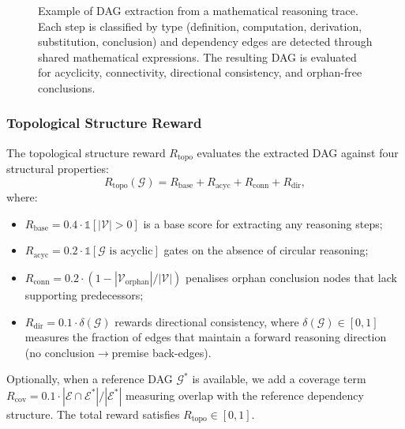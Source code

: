 \begin{figure}[t]
    \centering
    \caption{Example of DAG extraction from a mathematical reasoning
    trace. Each step is classified by type (definition, computation,
    derivation, substitution, conclusion) and dependency edges are
    detected through shared mathematical expressions. The resulting DAG
    is evaluated for acyclicity, connectivity, directional consistency,
    and orphan-free conclusions.}
    \label{fig:dag_extraction}
\end{figure}

\subsubsection{Topological Structure Reward}
\label{sec:r_topo}

The topological structure reward $R_{\mathrm{topo}}$ evaluates the
extracted DAG against four structural properties:
\begin{equation}
\label{eq:r_topo}
R_{\mathrm{topo}}(\mathcal{G}) = R_{\mathrm{base}} + R_{\mathrm{acyc}}
    + R_{\mathrm{conn}} + R_{\mathrm{dir}},
\end{equation}
where:
\begin{itemize}[leftmargin=*,itemsep=1pt]
    \item $R_{\mathrm{base}} = 0.4 \cdot \mathbb{1}[|\mathcal{V}| > 0]$
    is a base score for extracting any reasoning steps;
    \item $R_{\mathrm{acyc}} = 0.2 \cdot \mathbb{1}[\mathcal{G} \text{ is
    acyclic}]$ gates on the absence of circular reasoning;
    \item $R_{\mathrm{conn}} = 0.2 \cdot (1 - |\mathcal{V}_{\mathrm{orphan}}|
    / |\mathcal{V}|)$ penalises orphan conclusion nodes that lack
    supporting predecessors;
    \item $R_{\mathrm{dir}} = 0.1 \cdot \delta(\mathcal{G})$ rewards
    directional consistency, where $\delta(\mathcal{G}) \in [0, 1]$
    measures the fraction of edges that maintain a forward reasoning
    direction (no conclusion$\to$premise back-edges).
\end{itemize}
Optionally, when a reference DAG $\mathcal{G}^*$ is available, we add a
coverage term $R_{\mathrm{cov}} = 0.1 \cdot |\mathcal{E} \cap
\mathcal{E}^*| / |\mathcal{E}^*|$ measuring overlap with the reference
dependency structure. The total reward satisfies $R_{\mathrm{topo}} \in
[0, 1]$.

